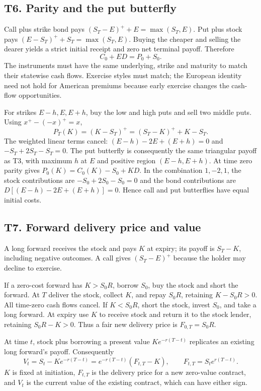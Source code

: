 \documentclass[11pt,a4paper]{article}
\begin{document}
\subsection{T6. Parity and the put butterfly}
Call plus strike bond pays $(S_T-E)^++E=\max(S_T,E)$. Put plus stock pays $(E-S_T)^++S_T=\max(S_T,E)$. Buying the cheaper and selling the dearer yields a strict initial receipt and zero net terminal payoff. Therefore
\[C_0+ED=P_0+S_0.\]
The instruments must have the same underlying, strike and maturity to match their statewise cash flows. Exercise styles must match; the European identity need not hold for American premiums because early exercise changes the cash-flow opportunities.

For strikes $E-h,E,E+h$, buy the low and high puts and sell two middle puts. Using $x^+-(-x)^+=x$,
\[
P_T(K)=(K-S_T)^+=(S_T-K)^++K-S_T.
\]
The weighted linear terms cancel:
$(E-h)-2E+(E+h)=0$ and $-S_T+2S_T-S_T=0$.
The put butterfly is consequently the same triangular payoff as T3, with maximum $h$ at $E$ and positive region $(E-h,E+h)$. At time zero parity gives $P_0(K)=C_0(K)-S_0+KD$. In the combination $1,-2,1$, the stock contributions are $-S_0+2S_0-S_0=0$ and the bond contributions are $D[(E-h)-2E+(E+h)]=0$. Hence call and put butterflies have equal initial costs.

\subsection{T7. Forward delivery price and value}
A long forward receives the stock and pays $K$ at expiry; its payoff is $S_T-K$, including negative outcomes. A call gives $(S_T-E)^+$ because the holder may decline to exercise.

If a zero-cost forward has $K>S_0R$, borrow $S_0$, buy the stock and short the forward. At $T$ deliver the stock, collect $K$, and repay $S_0R$, retaining $K-S_0R>0$. All time-zero cash flows cancel. If $K<S_0R$, short the stock, invest $S_0$, and take a long forward. At expiry use $K$ to receive stock and return it to the stock lender, retaining $S_0R-K>0$. Thus a fair new delivery price is $F_{0,T}=S_0R$.

At time $t$, stock plus borrowing a present value $Ke^{-r(T-t)}$ replicates an existing long forward's payoff. Consequently
\[
V_t=S_t-Ke^{-r(T-t)}
=e^{-r(T-t)}(F_{t,T}-K),\qquad F_{t,T}=S_te^{r(T-t)}.
\]
$K$ is fixed at initiation, $F_{t,T}$ is the delivery price for a new zero-value contract, and $V_t$ is the current value of the existing contract, which can have either sign.
\end{document}
